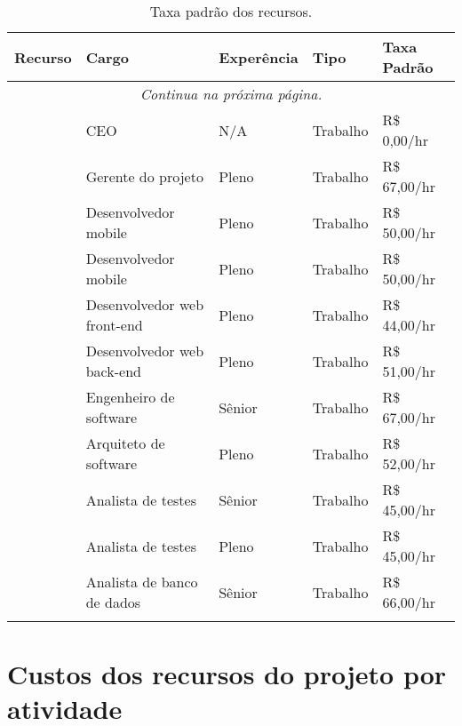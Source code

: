 \begin{longtable}{ p{} p{} l l l }
	\toprule
	\textbf{Recurso}      & \textbf{Cargo}              & \textbf{Experência} & \textbf{Tipo} & \textbf{Taxa Padrão} \\
	\midrule
	\endhead
	\multicolumn{5}{c}{{\textit{Continua na próxima página.}}} \\
	\endfoot
	\endlastfoot
	\ceoName{}            & CEO                         & N/A                  & Trabalho      & R\$ 0,00/hr           \\
	\midrule
	\projectManagerName{} & Gerente do projeto          & Pleno                & Trabalho      & R\$ 67,00/hr          \\
	\midrule
	\mobDevOneName{}      & Desenvolvedor mobile        & Pleno                & Trabalho      & R\$ 50,00/hr          \\
	\midrule
	\mobDevTwoName{}      & Desenvolvedor mobile        & Pleno                & Trabalho      & R\$ 50,00/hr          \\
	\midrule
	\frontWebDevName{}    & Desenvolvedor web front-end & Pleno                & Trabalho      & R\$ 44,00/hr          \\
	\midrule
	\backWebDevName{}     & Desenvolvedor web back-end  & Pleno                & Trabalho      & R\$ 51,00/hr          \\
	\midrule
	\softEngName{}        & Engenheiro de software      & Sênior              & Trabalho      & R\$ 67,00/hr          \\
	\midrule
	\softArcName{}        & Arquiteto de software       & Pleno                & Trabalho      & R\$ 52,00/hr          \\
	\midrule
	\testAnalOneName{}    & Analista de testes          & Sênior              & Trabalho      & R\$ 45,00/hr          \\
	\midrule
	\testAnalTwoName{}    & Analista de testes          & Pleno                & Trabalho      & R\$ 45,00/hr          \\
	\midrule
	\dbAnalName{}         & Analista de banco de dados  & Sênior              & Trabalho      & R\$ 66,00/hr          \\
	\bottomrule
	\caption{Taxa padrão dos recursos.}
	\centering
\end{longtable}

\section{Custos dos recursos do projeto por atividade}

